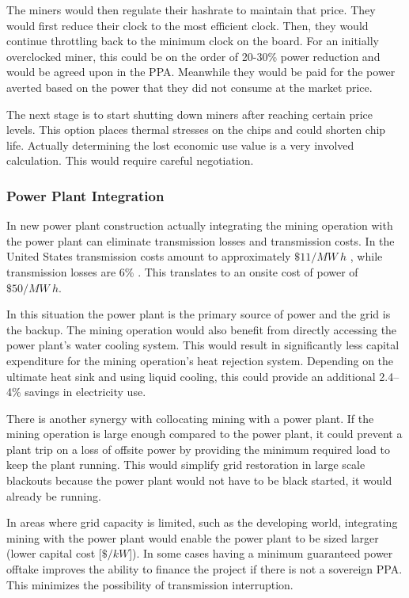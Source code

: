 \documentclass[runningheads]{llncs}
\begin{document}
The miners would then regulate their hashrate to maintain that price.
They would first reduce their clock to the most efficient clock.
Then, they would continue throttling back to the minimum clock on the board.
For an initially overclocked miner, this could be on the order of 20-30\% power reduction and would be agreed upon in the PPA.
Meanwhile they would be paid for the power averted based on the power that they did not consume at the market price.

The next stage is to start shutting down miners after reaching certain price levels.
This option places thermal stresses on the chips and could shorten chip life.
Actually determining the lost economic use value is a very involved calculation.
This would require careful negotiation.

\subsubsection{Power Plant Integration}
In new power plant construction actually integrating the mining operation with the power plant can eliminate transmission losses and transmission costs.
In the United States transmission costs amount to approximately $\$11/MW~h$ \cite{ier2021transmission}, while transmission losses are 6\% \cite{worldbank2021losses}.
This translates to an onsite cost of power of $\$50/MW~h$.

In this situation the power plant is the primary source of power and the grid is the backup.
The mining operation would also benefit from directly accessing the power plant's water cooling system.
This would result in significantly less capital expenditure for the mining operation's heat rejection system.
Depending on the ultimate heat sink and using liquid cooling, this could provide an additional 2.4--4\% savings in electricity use.

There is another synergy with collocating mining with a power plant.
If the mining operation is large enough compared to the power plant, it could prevent a plant trip on a loss of offsite power by providing the minimum required load to keep the plant running.
This would simplify grid restoration in large scale blackouts because the power plant would not have to be black started, it would already be running.

In areas where grid capacity is limited, such as the developing world, integrating mining with the power plant would enable the power plant to be sized larger (lower capital cost [$\$/kW$]).
In some cases having a minimum guaranteed power offtake improves the ability to finance the project if there is not a sovereign PPA.
This minimizes the possibility of transmission interruption.
\end{document}

